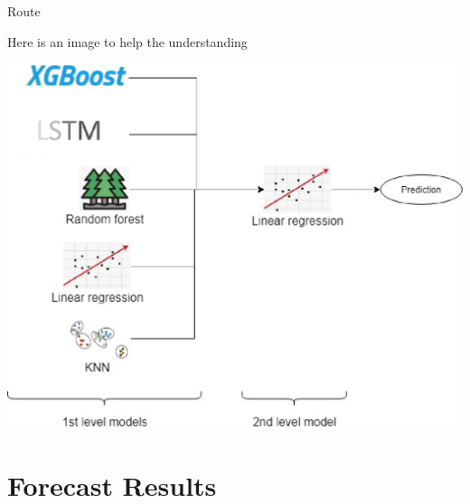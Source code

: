 \documentclass[
 size=12pt,
 paper=smartboard, %
 mode=present, %
 display=slides, %
 style=tuliplab,  %
 pauseslide,
 fleqn,leqno,clock]{powerdot}
\begin{document}
\begin{slide}{Route}

	Here is an image to help the understanding

	\begin{center}
		\includegraphics[width=.5\linewidth]{figures/Ensemble.eps}
	\end{center}

\end{slide}

\section{Forecast Results}
\end{document}
